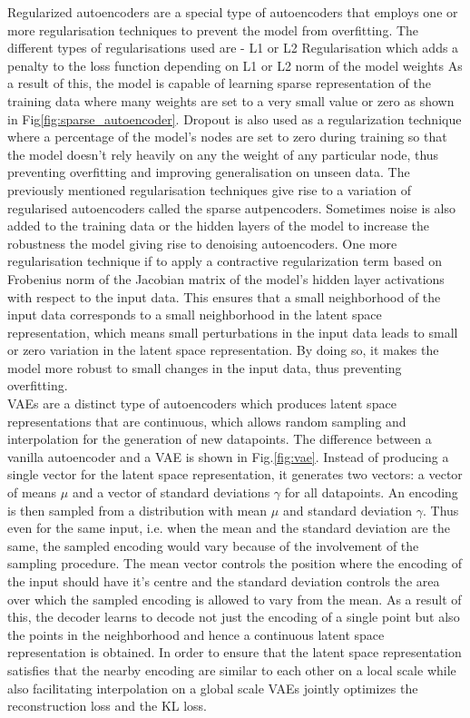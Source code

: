 Regularized autoencoders are a special type of autoencoders that employs one or more regularisation techniques to prevent the model from overfitting. The different types of regularisations used are - L1 or L2 Regularisation which adds a penalty to the loss function depending on L1 or L2 norm of the model weights As a result of this, the model is capable of learning sparse representation of the training data where many weights are set to a very small value or zero as shown in Fig\ref*{fig:sparse_autoencoder}. Dropout is also used as a regularization technique where a percentage of the model's nodes are set to zero during training so that the model doesn't rely heavily on any the weight of any particular node, thus preventing overfitting and improving generalisation on unseen data. The previously mentioned regularisation techniques give rise to a variation of regularised autoencoders called the sparse autpencoders\cite*{ng2011sparse}. Sometimes noise is also added to the training data or the hidden layers of the model to increase the robustness the model giving rise to denoising autoencoders\cite*{vincent2008extracting}. One more regularisation technique if to apply a contractive regularization term based on Frobenius norm of the Jacobian matrix of the model's hidden layer activations with respect to the input data\cite*{rifai2011contractive,autoencoder}. This ensures that a small neighborhood of the input data corresponds to a small neighborhood in the latent space representation, which means small perturbations in the input data leads to small or zero variation in the latent space representation\cite*{rifai2011contractive,autoencoder}. By doing so, it makes the model more robust to small changes in the input data, thus preventing overfitting.\\
\ac{VAE}s are a distinct type of autoencoders which produces latent space representations that are continuous, which allows random sampling and interpolation for the generation of new datapoints. The difference between a vanilla autoencoder and a \ac*{VAE} is shown in Fig.\ref*{fig:vae}. Instead of producing a single vector for the latent space representation, it generates two vectors: a vector of means $\mu$ and a vector of standard deviations $\gamma$ for all datapoints. An encoding is then sampled from a distribution with mean $\mu$ and standard deviation $\gamma$. Thus even for the same input, i.e. when the mean and the standard deviation are the same, the sampled encoding would vary because of the involvement of the sampling procedure. The mean vector controls the position where the encoding of the input should have it's centre and the standard deviation controls the area over which the sampled encoding is allowed to vary from the mean. As a result of this, the decoder learns to decode not just the encoding of a single point but also the points in the neighborhood and hence a continuous latent space representation is obtained. In order to ensure that the latent space representation satisfies that the nearby encoding are similar to each other on a local scale while also facilitating interpolation on a global scale \ac{VAE}s jointly optimizes the reconstruction loss and the \ac*{KL}\cite*{kullback1951information} loss.\cite*{kingma2019introduction,vae}
